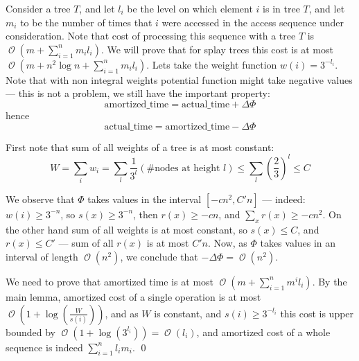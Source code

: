 \documentclass[11pt]{article}
\DeclareMathOperator*{\Oh}{\mathcal{O}}
\begin{document}
Consider a tree $T$, and let $l_i$ be the level on which element $i$ is in tree $T$, and let $m_i$ to be the number of times that $i$ were accessed in the access sequence under consideration.
Note that cost of processing this sequence with a tree $T$ is $\Oh(m + \sum_{i=1}^n m_i l_i)$. We will prove that for splay trees this cost is at most $\Oh(m + n^2 \log n + \sum_{i=1}^n m_i l_i)$. Lets take the weight function $w(i) = 3^{-l_i}$. Note that with non integral weights potential function might take negative values --- this is not a problem, we still have the important property:
\begin{equation*}
\mathrm{amortized\_time} = \mathrm{actual\_time} + \Delta\Phi
\end{equation*}
hence
\begin{equation*}
\mathrm{actual\_time} = \mathrm{amortized\_time} - \Delta\Phi
\end{equation*}

First note that sum of all weights of a tree is at most constant:
\begin{equation*}
	W = \sum_{i} w_i = \sum_{l} \frac{1}{3^l} (\# \text{nodes at height }l) \leq \sum_l \left( \frac{2}{3} \right)^l \leq C
\end{equation*}

We observe that $\Phi$ takes values in the interval $[-c n^2, C' n]$ --- indeed: $w(i) \geq 3^{-n}$, so  $s(x) \geq 3^{-n}$, then $r(x) \geq -c n$, and $\sum_x r(x) \geq -c n^2$. On the other hand sum of all weights is at most constant, so $s(x) \leq C$, and $r(x) \leq C'$ --- sum of all $r(x)$ is at most $C' n$.  Now, as $\Phi$ takes values in an interval of length $\Oh(n^2)$, we conclude that $- \Delta\Phi = \Oh(n^2)$.

We need to prove that amortized time is at most $\Oh(m + \sum_{i=1}^n m^i l_i)$. By the main lemma, amortized cost of a single operation is at most $\Oh(1 + \log(\frac{W}{s(i)}))$, and as $W$ is constant, and $s(i) \geq 3^{-l_i}$ this cost is upper bounded by $\Oh(1 + \log(3^{l_i})) = \Oh(l_i)$, and amortized cost of a whole sequence is indeed $\sum_{i=1}^n l_i m_i$.
\qed

{}

\end{document}

